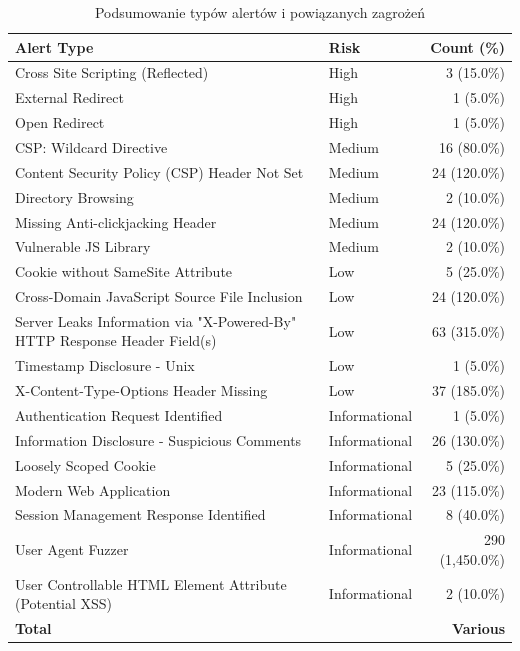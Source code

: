   \begin{table}[htbp]
    \centering
    \scriptsize
    \caption{Podsumowanie typów alertów i powiązanych zagrożeń}
    \label{tab:alert_summary}
    \begin{tabular}{|l|l|r|}
    \hline
    \textbf{Alert Type} & \textbf{Risk} & \textbf{Count (\%)} \\
    \hline
    Cross Site Scripting (Reflected) & High & 3 (15.0\%) \\
    External Redirect & High & 1 (5.0\%) \\
    Open Redirect & High & 1 (5.0\%) \\
    CSP: Wildcard Directive & Medium & 16 (80.0\%) \\
    Content Security Policy (CSP) Header Not Set & Medium & 24 (120.0\%) \\
    Directory Browsing & Medium & 2 (10.0\%) \\
    Missing Anti-clickjacking Header & Medium & 24 (120.0\%) \\
    Vulnerable JS Library & Medium & 2 (10.0\%) \\
    Cookie without SameSite Attribute & Low & 5 (25.0\%) \\
    Cross-Domain JavaScript Source File Inclusion & Low & 24 (120.0\%) \\
    Server Leaks Information via "X-Powered-By" HTTP Response Header Field(s) & Low & 63 (315.0\%) \\
    Timestamp Disclosure - Unix & Low & 1 (5.0\%) \\
    X-Content-Type-Options Header Missing & Low & 37 (185.0\%) \\
    Authentication Request Identified & Informational & 1 (5.0\%) \\
    Information Disclosure - Suspicious Comments & Informational & 26 (130.0\%) \\
    Loosely Scoped Cookie & Informational & 5 (25.0\%) \\
    Modern Web Application & Informational & 23 (115.0\%) \\
    Session Management Response Identified & Informational & 8 (40.0\%) \\
    User Agent Fuzzer & Informational & 290 (1,450.0\%) \\
    User Controllable HTML Element Attribute (Potential XSS) & Informational & 2 (10.0\%) \\
    \hline
    \textbf{Total} & & \textbf{Various} \\
    \hline
    \end{tabular}
    \end{table}
    
